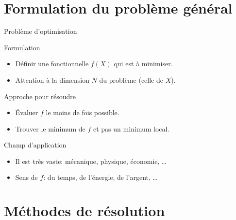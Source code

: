 \documentclass[8pt,a4paper]{beamer}
\begin{document}
\section{Formulation du problème général}

\begin{frame}{Problème d'optimisation}
    
  \begin{block}{Formulation}
  \begin{itemize}
  \item Définir une fonctionnelle $f(X)$ qui est à minimiser.
  \item Attention à la dimension $N$ du problème (celle de $X$). 
  \end{itemize}
  \end{block}
  
 \begin{block}{Approche pour résoudre}
  \begin{itemize}
  \item Évaluer $f$ le moins de fois possible.
  \item Trouver le minimum de $f$ et pas un minimum local.
  \end{itemize}
  \end{block} 
  
 \begin{block}{Champ d'application}
  \begin{itemize}
  \item Il est très vaste: mécanique, physique, économie, \ldots
  \item Sens de $f$: du temps, de l'énergie, de l'argent, \ldots
  \end{itemize}
  \end{block}   
  
\end{frame}

\section{Méthodes de résolution}
\end{document}
